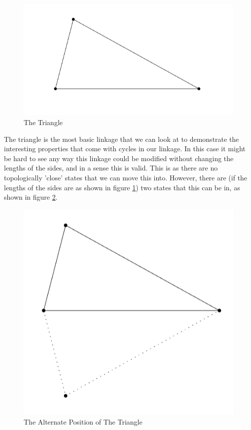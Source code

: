\documentclass{article}
\begin{document}
\begin{figure}[h!]
\centering
\includegraphics[scale=0.5]{./images/triangle}
\caption{The Triangle}
\label{fig:The Triangle}
\end{figure}

\noindent The triangle is the most basic linkage that we can look at to demonstrate the interesting properties that come with cycles in our linkage. In this case it might be hard to see any way this linkage could be modified without changing the lengths of the sides, and in a sense this is valid. This is as there are no topologically 'close' states that we can move this into. However, there are (if the lengths of the sides are as shown in figure \ref{fig:The Triangle}) two states that this can be in, as shown in figure \ref{fig:The Alternate Position of The Triangle}. 

\begin{figure}[h!]
\centering
\includegraphics[scale=0.5]{./images/triangle_alt_switch}
\caption{The Alternate Position of The Triangle}
\label{fig:The Alternate Position of The Triangle}
\end{figure}
\end{document}
